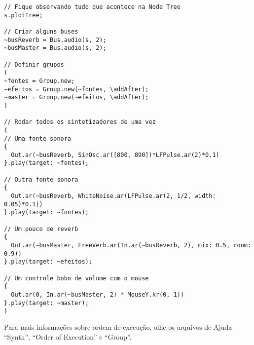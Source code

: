 \begin{lstlisting}[style=SuperCollider-IDE, basicstyle=\scttfamily\footnotesize]
// Fique observando tudo que acontece na Node Tree
s.plotTree;

// Criar alguns buses
~busReverb = Bus.audio(s, 2);
~busMaster = Bus.audio(s, 2);

// Definir grupos
(
~fontes = Group.new;
~efeitos = Group.new(~fontes, \addAfter);
~master = Group.new(~efeitos, \addAfter);
)

// Rodar todos os sintetizadores de uma vez
(
// Uma fonte sonora
{
  Out.ar(~busReverb, SinOsc.ar([800, 890])*LFPulse.ar(2)*0.1)
}.play(target: ~fontes);

// Outra fonte sonora
{
  Out.ar(~busReverb, WhiteNoise.ar(LFPulse.ar(2, 1/2, width: 0.05)*0.1))
}.play(target: ~fontes);

// Um pouco de reverb
{
  Out.ar(~busMaster, FreeVerb.ar(In.ar(~busReverb, 2), mix: 0.5, room: 0.9))
}.play(target: ~efeitos);

// Um controle bobo de volume com o mouse
{
  Out.ar(0, In.ar(~busMaster, 2) * MouseY.kr(0, 1))
}.play(target: ~master);
)
\end{lstlisting}

Para mais informações sobre ordem de execução, olhe os arquivos de Ajuda “Synth”, “Order of Execution” e “Group”.
